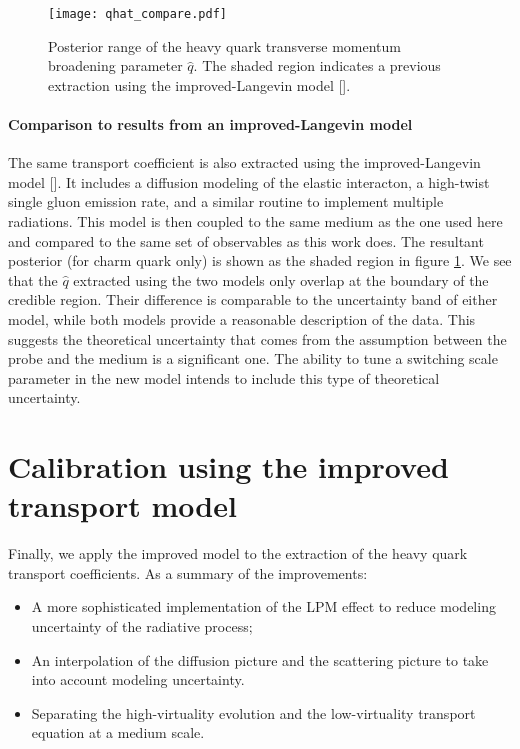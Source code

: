 \begin{figure}
\texttt{[image: qhat\_compare.pdf]}
\caption{Posterior range of the heavy quark transverse momentum broadening parameter $\hat{q}$. The shaded region indicates a previous extraction using the improved-Langevin model [].}\label{fig:compare_qhat}
\end{figure}

\paragraph{Comparison to results from an improved-Langevin model}
The same transport coefficient is also extracted using the improved-Langevin model [].
It includes a diffusion modeling of the elastic interacton, a high-twist single gluon emission rate, and a similar routine to implement multiple radiations.
This model is then coupled to the same medium as the one used here and compared to the same set of observables as this work does.
The resultant posterior (for charm quark only) is shown as the shaded region in figure \ref{fig:compare_qhat}.
We see that the $\hat{q}$ extracted using the two models only overlap at the boundary of the credible region.
Their difference is comparable to the uncertainty band of either model, while both models provide a reasonable description of the data.
This suggests the theoretical uncertainty that comes from the assumption between the probe and the medium is a significant one.
The ability to tune a switching scale parameter in the new model intends to include this type of theoretical uncertainty.

\section{Calibration using the improved transport model}
Finally, we apply the improved model to the extraction of the heavy quark transport coefficients.
As a summary of the improvements:
\begin{itemize}
\item A more sophisticated implementation of the LPM effect to reduce modeling uncertainty of the radiative process;
\item An interpolation of the diffusion picture and the scattering picture to take into account modeling uncertainty.
\item Separating the high-virtuality evolution and the low-virtuality transport equation at a medium scale.
\end{itemize}

